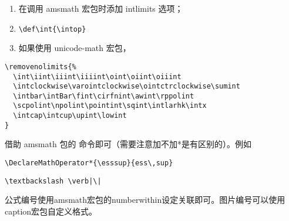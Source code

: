 \begin{enumerate}
\def\labelenumi{\arabic{enumi}.}

\item
  在调用 amsmath 宏包时添加 intlimits 选项；
\item
  \texttt{\textbackslash{}def\textbackslash{}int\{\textbackslash{}intop\}}
\item
  如果使用 unicode-math 宏包，
\end{enumerate}

\begin{verbatim}
\removenolimits{%
  \int\iint\iiint\iiiint\oint\oiint\oiiint
  \intclockwise\varointclockwise\ointctrclockwise\sumint
  \intbar\intBar\fint\cirfnint\awint\rppolint
  \scpolint\npolint\pointint\sqint\intlarhk\intx
  \intcap\intcup\upint\lowint
}
\end{verbatim}



借助 amsmath 包的
 命令即可（需要注意加不加*是有区别的）。例如

\begin{verbatim}
\DeclareMathOperator*{\esssup}{ess\,sup}
\end{verbatim}







\begin{verbatim}
\textbackslash \verb|\|
\end{verbatim}



公式编号使用amsmath宏包的numberwithin设定关联即可。图片编号可以使用caption宏包自定义格式。
